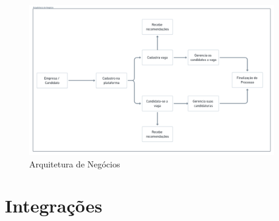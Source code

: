 \begin{figure}[htb]
	\centering
	\caption{\label{fig_arq_negocio}Arquitetura de Negócios}
	\includegraphics[width=0.95\textwidth]{../Figuras/arq-proj-arq-negocio.png}
\end{figure}

\section{Integrações}
